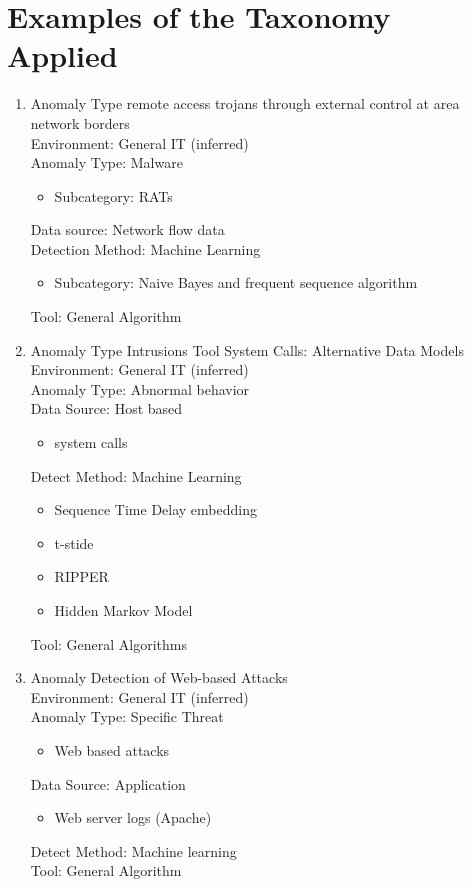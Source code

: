 \documentclass[10pt]{IEEEtran}
\begin{document}
\section{Examples of the Taxonomy Applied}
\begin{enumerate}
    \item 
    Anomaly Type remote access trojans through external control at area network borders\cite{wu2017detecting} \\
    Environment: General IT (inferred) \\
    Anomaly Type: Malware 
    \begin{itemize}
        \item Subcategory: RATs
    \end{itemize}  
    Data source: Network flow data\\ 
    Detection Method: Machine Learning
    \begin{itemize}
        \item Subcategory: Naive Bayes and frequent sequence algorithm
    \end{itemize} 
    Tool: General Algorithm
    
    \item 
    Anomaly Type Intrusions Tool System Calls: Alternative Data Models\cite{warrender1999detecting}\\
    Environment: General IT (inferred)\\
    Anomaly Type: Abnormal behavior \\
    Data Source: Host based 
    \begin{itemize}
        \item system calls
    \end{itemize}
    Detect Method: Machine Learning
    \begin{itemize}
        \item Sequence Time Delay embedding
        \item t-stide
        \item RIPPER
        \item Hidden Markov Model
    \end{itemize} 
    Tool: General Algorithms
    
    \item  
    Anomaly Detection of Web-based Attacks\cite{kruegel2003anomaly}\\
    Environment: General IT (inferred) \\   
    Anomaly Type: Specific Threat 
    \begin{itemize}
        \item Web based attacks
    \end{itemize}
    Data Source: Application
    \begin{itemize}
        \item Web server logs (Apache)
    \end{itemize}
    Detect Method: Machine learning\\
    Tool: General Algorithm
    

\end{enumerate}
\end{document}
